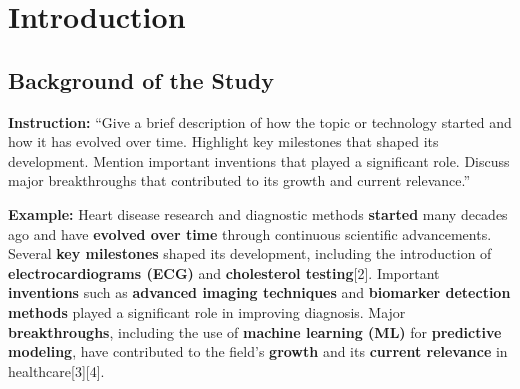 \chapter{Introduction}
\label{introduction}







\section{Background of the Study} 

{\color{red} \textbf{  Instruction:}  “Give a brief description of how the topic or technology started and how it has evolved over time. Highlight key milestones that shaped its development. Mention important inventions that played a significant role. Discuss major breakthroughs that contributed to its growth and current relevance.”}

 \textbf{\color{blue} Example:} Heart disease research and diagnostic methods \textbf{started} many decades ago and have \textbf{evolved over time} through continuous scientific advancements. Several \textbf{key milestones} shaped its development, including the introduction of \textbf{electrocardiograms (ECG)} and \textbf{cholesterol testing}[2]. Important \textbf{inventions} such as \textbf{advanced imaging techniques} and \textbf{biomarker detection methods} played a significant role in improving diagnosis. Major \textbf{breakthroughs}, including the use of \textbf{machine learning (ML)} for \textbf{predictive modeling}, have contributed to the field’s \textbf{growth} and its \textbf{current relevance} in healthcare[3][4].



